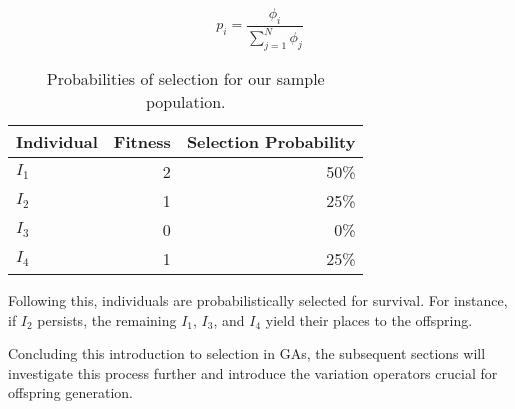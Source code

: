   \begin{equation}
    \label{eq:selection_probability}
    p_i = \frac{\phi_i}{\sum_{j=1}^{N}\phi_j}
  \end{equation}

  \begin{table}[ht!]
    \centering
    \begin{tabular}{|l|r|r|}
      \hline
      Individual & Fitness & Selection Probability \\
      \hline
      \(I_1\)    & 2       & 50\% \\
      \(I_2\)    & 1       & 25\% \\
      \(I_3\)    & 0       & 0\%  \\
      \(I_4\)    & 1       & 25\% \\
      \hline
    \end{tabular}
    \caption{Probabilities of selection for our sample population.}
    \label{tab:selection_probabilities}
  \end{table}

  Following this, individuals are probabilistically selected for survival.
  For instance, if \(I_2\) persists, the remaining \(I_1\), \(I_3\), and \(I_4\) 
  yield their places to the offspring.

  Concluding this introduction to selection in GAs, the subsequent sections will 
  investigate this process further and introduce the variation operators crucial 
  for offspring generation.
  